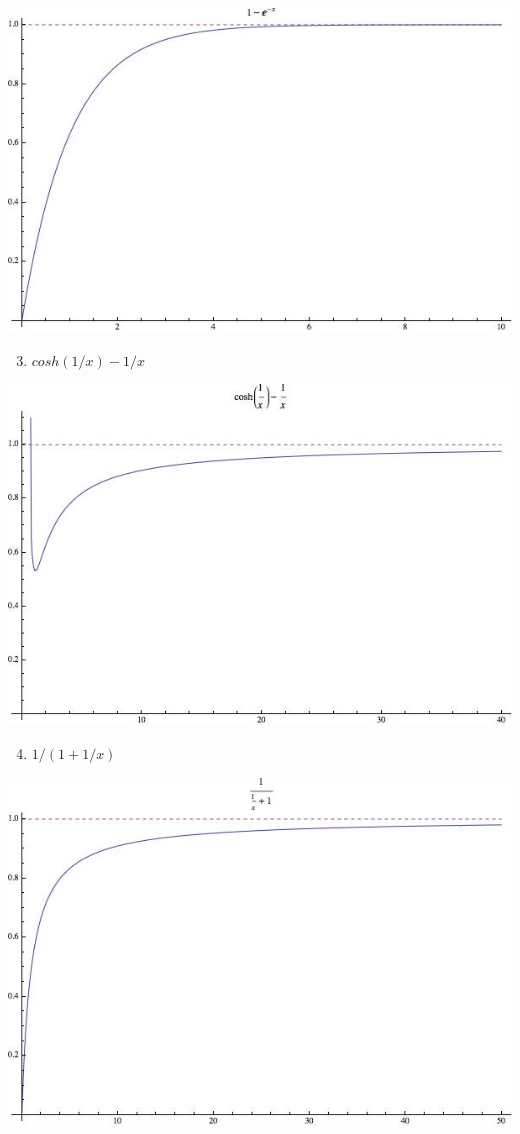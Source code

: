 \documentclass[letterpaper,10pt,english]{sphinxmanual}
\begin{document}
\includegraphics[width=0.800\linewidth]{exp11.jpg}
\begin{enumerate}
\setcounter{enumi}{2}
\item {} 
$cosh(1/x)-1/x$

\end{enumerate}

\includegraphics[width=0.800\linewidth]{cosh11.jpg}
\begin{enumerate}
\setcounter{enumi}{3}
\item {} 
$1/(1+1/x)$

\end{enumerate}

\includegraphics[width=0.800\linewidth]{fraction11.jpg}
\end{document}
